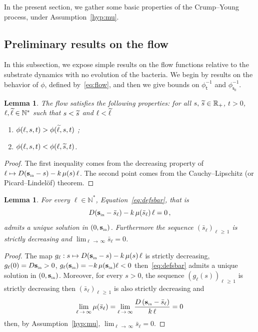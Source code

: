 \documentclass[10pt]{amsart}
\newtheorem{lemm}[theo]{Lemma}\newtheorem{prop}[theo]{Proposition}\newtheorem{coro}[theo]{Corollary}\newtheorem{conj}[theo]{Conjecture}
\theoremstyle{definition}\newtheorem{defi}[theo]{Definition}\newtheorem{rema}[theo]{Remark}\newtheorem{exam}[theo]{Example}\newtheorem{exem}[theo]{Example}\newtheorem{nota}[theo]{Notation}
\newcommand{\RR}{\mathbb{R}}
\newcommand{\NN}{\mathbb{N}}
\newcommand{\Sin}{{\mathbf s}_{\textrm{\tiny\rm in}}}
\newcommand{\phit}{\phi_\textsf{t}^{-1}}
\newcommand{\phis}{\phi_{\textsf{s}_0}^{-1}}
\newcommand{\1}{\mathbf{1}}
\let\oldtilde\tilde
\renewcommand*{\tilde}[1]{\mathchoice{\widetilde{#1}}{\widetilde{#1}}{\oldtilde{#1}}{\oldtilde{#1}}}
\begin{document}
In the present section, we gather some basic properties of the Crump--Young process, under Assumption~\ref{hyp:mu}.



\subsection{Preliminary results on the flow}\label{sec.preliminary.flow}


In this subsection, we expose simple results on the flow functions relative to the substrate dynamics with no evolution of the bacteria. We begin by results on the behavior of $\phi$, defined by~\eqref{eq:flow}, and then we give bounds on $\phit$ and $\phis$.

\begin{lemm}\label{prop.monotony.flow}
The flow satisfies the following properties: for all $s,\, \tilde s \in \RR_+$, $t> 0$, $\ell, \tilde \ell \in \NN^*$ such that $s< \tilde s$ and $\ell < \tilde \ell$
\begin{enumerate}
\item\label{lemmA.1} $\phi(\ell,s,t)>\phi(\tilde \ell,s,t)$ ;
\item\label{lemmA.2} $\phi(\ell,s,t)< \phi(\ell,\tilde s,t)$.
\end{enumerate}
\end{lemm}
\begin{proof}
The first inequality comes from the decreasing property of $\ell \mapsto D(\Sin-s)\linebreak-k\,\mu(s)\,\ell$. The second point comes from the Cauchy--Lipschitz (or Picard--Lindel\"of) theorem.
\end{proof}

\begin{lemm}\label{lem:defsbar}
For every $\ell\in \NN^*$, Equation~\eqref{eq:defsbar}, that is
\[
D(\Sin-\bar s_\ell)-k\,\mu(\bar s_\ell)\,\ell = 0\,,
\]
admits a unique solution in $(0,\Sin)$. Furthermore the sequence $(\bar s_\ell)_{\ell\,\geq\,1}$ is strictly decreasing and $\lim_{\ell\,\to\,\infty} \bar s_\ell = 0$.
\end{lemm}
\begin{proof}
The map $g_\ell:s\mapsto D(\Sin-s)-k\,\mu(s)\,\ell$ is strictly decreasing, $g_\ell(0)=D \Sin>0$, $g_\ell(\Sin)=-k\,\mu(\Sin)\ell<0$ then~\eqref{eq:defsbar} admits a unique solution in $(0,\Sin)$. Moreover, for every $s> 0$, the sequence $(g_\ell(s))_{\ell\,\geq\,1}$ is strictly decreasing then $(\bar s_\ell)_{\ell\,\geq\,1}$ is also strictly decreasing and
\[
\lim_{\ell\,\to\,\infty} \mu(\bar s_\ell) = \lim_{\ell\,\to\,\infty} \frac{D\,(\Sin-\bar s_\ell)}{k\,\ell} = 0
\]
then, by Assumption~\ref{hyp:mu}, $\lim_{\ell\,\to\,\infty} \bar s_\ell = 0$.
\end{proof}
\end{document}

